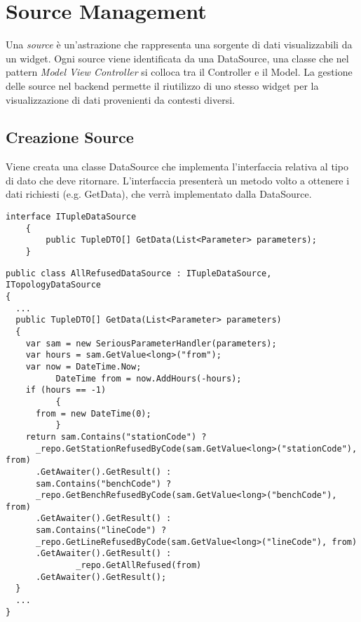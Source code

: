 \section{Source Management}

Una \textit{source} è un'astrazione che rappresenta una sorgente di dati visualizzabili da un widget. Ogni source viene identificata da una DataSource, una classe che nel pattern \textit{Model View Controller} si colloca tra il Controller e il Model. La gestione delle source nel backend permette il riutilizzo di uno stesso widget per la visualizzazione di dati provenienti da contesti diversi.

\subsection{Creazione Source}
\label{subsec:creazioneSource}
Viene creata una classe DataSource che implementa l’interfaccia relativa al tipo di dato che deve ritornare. L'interfaccia presenterà un metodo volto a ottenere i dati richiesti (e.g. GetData), che verrà implementato dalla DataSource.
\begin{lstlisting}[caption={ITupleDataSource.cs}, style=sharpCode]
interface ITupleDataSource
    {
        public TupleDTO[] GetData(List<Parameter> parameters);
    }
\end{lstlisting}
\begin{lstlisting}[caption={TupleDataSource.cs}, style=sharpCode]
public class AllRefusedDataSource : ITupleDataSource, ITopologyDataSource
{
  ...
  public TupleDTO[] GetData(List<Parameter> parameters)
  {
    var sam = new SeriousParameterHandler(parameters);
    var hours = sam.GetValue<long>("from");
    var now = DateTime.Now;
          DateTime from = now.AddHours(-hours);
    if (hours == -1)
          {
      from = new DateTime(0);
          }
    return sam.Contains("stationCode") ? 
      _repo.GetStationRefusedByCode(sam.GetValue<long>("stationCode"), from)
      .GetAwaiter().GetResult() :
      sam.Contains("benchCode") ? 
      _repo.GetBenchRefusedByCode(sam.GetValue<long>("benchCode"), from)
      .GetAwaiter().GetResult() :
      sam.Contains("lineCode") ?
      _repo.GetLineRefusedByCode(sam.GetValue<long>("lineCode"), from)
      .GetAwaiter().GetResult() :
              _repo.GetAllRefused(from)
      .GetAwaiter().GetResult();
  }
  ...
}
\end{lstlisting}

